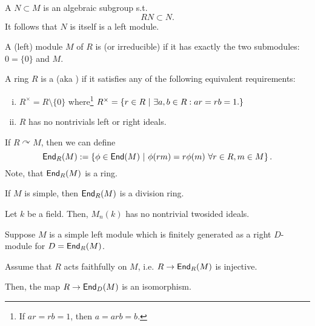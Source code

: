 \begin{definition}
	A  $N \subset M$ is an algebraic subgroup s.t.
	\[ RN \subset N. \]
	It follows that $N$ is itself is a left module.
\end{definition}
\begin{definition}
	A (left) module $M$ of $R$ is  (or irreducible) if it has exactly the two submodules: $0 = \{0\}$ and $M$.
\end{definition}
\begin{definition}
	A ring $R$ is a  (aka ) if it satisfies any of the following equivalent requirements:
	\begin{enumerate}[(i)]
		\item $R^\times = R \setminus \{0\} $
		where\footnote{If $ar = rb = 1$, then $a = arb = b$.} $R^\times = \left\lbrace r \in R ~ | ~ \exists a,b \in R: ar = rb = 1.\right\rbrace$
		\item $R$ has no nontrivials left or right ideals.
	\end{enumerate}
\end{definition}
\begin{definition}
If $R \curvearrowright M$, then we can define
\[ \textsf{End}_R(M) := \left\lbrace\phi \in \textsf{End}(M) ~ | ~ \phi(rm) = r\phi(m) ~\forall r\in R, m \in M\right\rbrace. \]
Note, that $\textsf{End}_R(M)$ is a ring.
\end{definition}
\begin{lemma}
	If $M$ is simple, then $\textsf{End}_R(M)$ is a division ring.
\end{lemma}
\begin{lemma}
	Let $k$ be a field. Then, $M_n(k)$ has no nontrivial twosided ideals.
\end{lemma}
\begin{theorem}
Suppose $M$ is a simple left module which is finitely generated as a right $D$-module for $D = \textsf{End}_R(M)$.

Assume that $R$ acts faithfully on $M$, i.e. $R \overset{}{\rightarrow} \textsf{End}_R(M)$ is injective.

Then, the map $R \overset{}{\rightarrow} \textsf{End}_D(M)$ is an isomorphism.
\end{theorem}